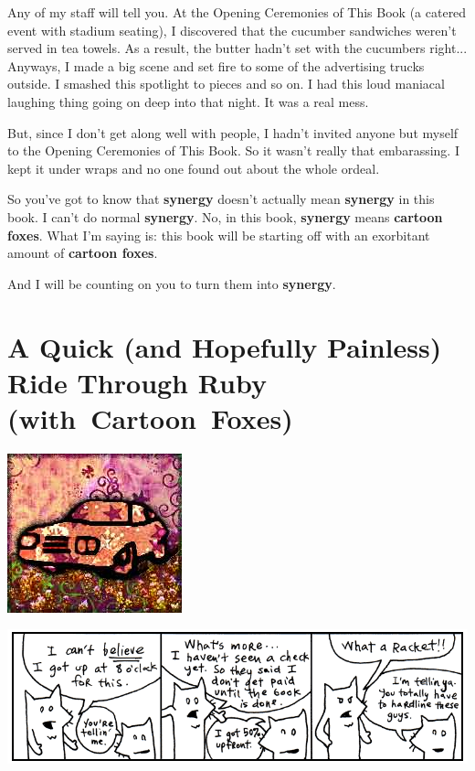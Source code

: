 \documentclass[10pt,twoside]{report}
\begin{document}
Any of my staff will tell you.  At the Opening Ceremonies of This Book
(a catered event with stadium seating), I discovered that the cucumber
sandwiches weren't served in tea towels. As a result, the butter
hadn't set with the cucumbers right... Anyways, I made a big scene and
set fire to some of the advertising trucks outside.  I smashed this
spotlight to pieces and so on.  I had this loud maniacal laughing
thing going on deep into that night.  It was a real mess.

But, since I don't get along well with people, I hadn't invited anyone
but myself to the Opening Ceremonies of This Book.  So it wasn't
really that embarassing.  I kept it under wraps and no one found out
about the whole ordeal.

So you've got to know that {\bf synergy} doesn't actually mean {\bf
  synergy} in this book.  I can't do normal {\bf synergy}. No, in this
book, {\bf synergy} means {\bf cartoon foxes}.  What I'm saying is:
this book will be starting off with an exorbitant amount of {\bf
  cartoon foxes}.

And I will be counting on you to turn them into {\bf synergy}.

\newpage
\thispagestyle{empty}
\mbox{}

\cleartooddpage

\chapter{A Quick (and Hopefully Painless) Ride Through Ruby \mbox{(with Cartoon Foxes)}}
\vfill
\begin{center}
  \includegraphics{cache/chapterpoignantguide3.png}
\end{center}
\vspace{2cm}
\newpage
\thispagestyle{empty}
\mbox{}
\clearpage

	\includegraphics[width=1.0\textwidth]{cache/5.png}
\end{document}
